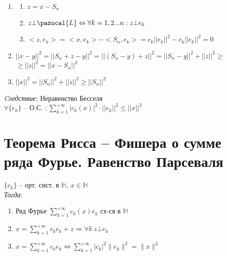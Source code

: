 \documentclass[paper=a4, fontsize=17pt]{article}
\begin{document}
\begin{enumerate}

	\item
	\begin{enumerate}
		\item $z = x - S_n$

		\item $z \bot \pazocal{L} \Leftrightarrow \forall k = 1, 2 ...n : z \bot e_k$

		\item $<z, e_k> = <x, e_k> - <S_n, e_k> = c_k ||e_k||^2 - c_k ||e_k||^2 = 0$
	\end{enumerate}

	\item $||x - y||^2 = ||S_n + z - y||^2 = ||(S_n - y) + z||^2 = ||S_n - y||^2 + ||z||^2 \geqslant$ $\geqslant ||z||^2 = ||x - S_n||^2$

	\item $||x||^2 = ||S_n||^2 + ||z||^2 \geqslant ||S_n||^2$
\end{enumerate}

\emph{Cледствие:} Неравенство Бесселя\\

$\forall \{e_k\}$ {{--}} О.С. $:\sum\limits_{k=1}^{+\infty} |c_k(x)|^2 \cdot ||e_k||^2 \leqslant ||x||^2$

\section{Теорема Рисса -- Фишера о сумме ряда Фурье. Равенство Парсеваля}
$\{e_k\}$ -- орт. сист. в $\mathds{H}$, $x \in \mathds{H}$\\

\emph{Тогда}:
\begin{enumerate}
	\item Ряд Фурье $\sum\limits_{k=1}^{+\infty} c_k(x) e_k$ сх-ся в $\mathds{H}$
	\item $x =\sum\limits_{k=1}^{+\infty} c_k e_k + z \Rightarrow \forall k \ z \bot e_k$
	\item $x =\sum\limits_{k=1}^{+\infty} c_k e_k \Leftrightarrow \sum\limits_{k=1}^{+\infty} \vert c_k \vert^2 \|e_k\|^2=\|x\|^2$
\end{enumerate}
\end{document}
